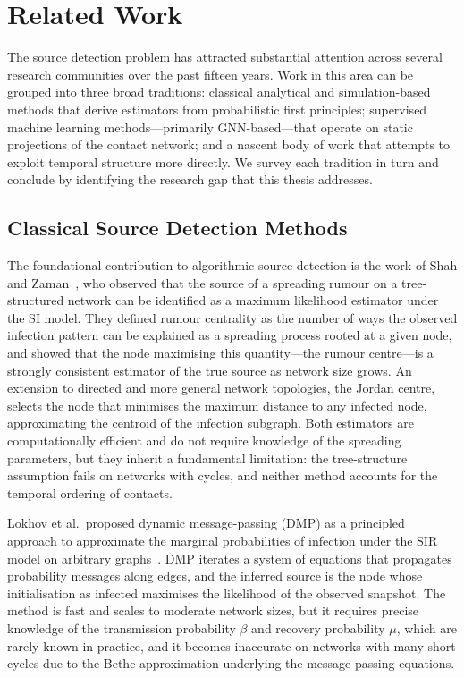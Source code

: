 \chapter{Related Work}
\label{c:relatedwork}

The source detection problem has attracted substantial attention across several research communities over the past fifteen years. Work in this area can be grouped into three broad traditions: classical analytical and simulation-based methods that derive estimators from probabilistic first principles; supervised machine learning methods---primarily GNN-based---that operate on static projections of the contact network; and a nascent body of work that attempts to exploit temporal structure more directly. We survey each tradition in turn and conclude by identifying the research gap that this thesis addresses.

\section{Classical Source Detection Methods}
\label{sec:rw-classical}

The foundational contribution to algorithmic source detection is the work of Shah and Zaman~\cite{Shah2011}, who observed that the source of a spreading rumour on a tree-structured network can be identified as a maximum likelihood estimator under the SI model. They defined rumour centrality as the number of ways the observed infection pattern can be explained as a spreading process rooted at a given node, and showed that the node maximising this quantity---the rumour centre---is a strongly consistent estimator of the true source as network size grows. An extension to directed and more general network topologies, the Jordan centre, selects the node that minimises the maximum distance to any infected node, approximating the centroid of the infection subgraph. Both estimators are computationally efficient and do not require knowledge of the spreading parameters, but they inherit a fundamental limitation: the tree-structure assumption fails on networks with cycles, and neither method accounts for the temporal ordering of contacts.

Lokhov et al.\ proposed dynamic message-passing (DMP) as a principled approach to approximate the marginal probabilities of infection under the SIR model on arbitrary graphs~\cite{Lokhov2014}. DMP iterates a system of equations that propagates probability messages along edges, and the inferred source is the node whose initialisation as infected maximises the likelihood of the observed snapshot. The method is fast and scales to moderate network sizes, but it requires precise knowledge of the transmission probability $\beta$ and recovery probability $\mu$, which are rarely known in practice, and it becomes inaccurate on networks with many short cycles due to the Bethe approximation underlying the message-passing equations.

